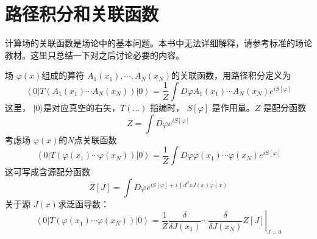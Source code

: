 \section{路径积分和关联函数}

计算场的关联函数是场论中的基本问题。本书中无法详细解释，请参考标准的场论教材。这里只总结一下对之后讨论必要的内容。

场 $\varphi(x) $组成的算符 $A_{1}\left(x_{1}\right), \cdots, A_{N}\left(x_{N}\right) $的关联函数，用路径积分定义为
\begin{equation}
	\left\langle 0\left|T\left(A_{1}\left(x_{1}\right) \cdots A_{N}\left(x_{N}\right)\right)\right| 0\right\rangle=\frac{1}{Z} \int D \varphi A_{1}\left(x_{1}\right) \cdots A_{N}\left(x_{N}\right) e^{i S[\varphi]}
\end{equation}
这里， $|0\rangle $是对应真空的右矢，$ T(...)$ 指编时， $S[\varphi]$ 是作用量。$ Z$ 是配分函数
\begin{equation}
	Z=\int D \varphi e^{i S[\varphi]}
\end{equation}
考虑场 $\varphi(x) $的$ N $点关联函数
\begin{equation}
		\left\langle 0\left|T\left(\varphi\left(x_{1}\right) \cdots \varphi\left(x_{N}\right)\right)\right| 0\right\rangle=\frac{1}{Z} \int D \varphi \varphi\left(x_{1}\right) \cdots \varphi\left(x_{N}\right) e^{i S[\varphi]}
\end{equation}
这可写成含源配分函数
\begin{equation}
		Z[J]=\int D \varphi e^{i S[\varphi]+i \int d^{d} x J(x) \varphi(x)}
\end{equation}
关于源 $J(x) $求泛函导数：
\begin{equation}
		\left\langle 0\left|T\left(\varphi\left(x_{1}\right) \cdots \varphi\left(x_{N}\right)\right)\right| 0\right\rangle=\left.\frac{1}{Z} \frac{\delta}{\delta J\left(x_{1}\right)} \cdots \frac{\delta}{\delta J\left(x_{N}\right)} Z[J]\right|_{J=0}
\end{equation}

